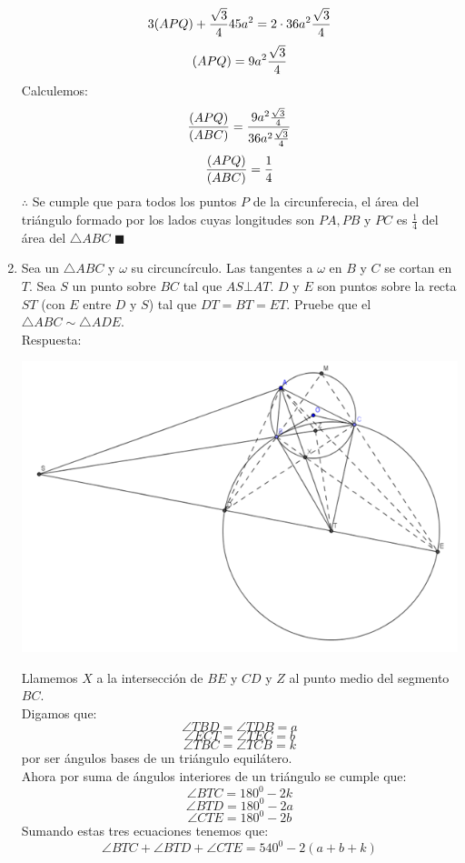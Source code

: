 \documentclass{book}
\begin{document}
\begin{enumerate}
        $$3(APQ)+{\sqrt{3}\over 4}45a^2=2\cdot 36a^2  {\sqrt{3}\over 4}$$
        $$(APQ)=9a^2 {\sqrt{3}\over 4}$$
        Calculemos:
        $$\frac{(APQ)}{(ABC)}=\frac{9a^2  {\sqrt{3}\over 4}}{36a^2  {\sqrt{3}\over 4}}$$
        $$\frac{(APQ)}{(ABC)}={1\over 4}$$
        $\therefore$ Se cumple que para todos los puntos $P$ de la circunferecia, el área del triángulo formado por los lados cuyas longitudes son $PA, PB$ y $PC$ es $\displaystyle{\frac{1}{4}}$ del área del $\triangle ABC$ $\blacksquare$\\
        \item Sea un $\triangle ABC$ y $\omega$ su circuncírculo. Las tangentes a $\omega$ en $B$ y $C$ se cortan en $T$. Sea $S$ un punto sobre $BC$ tal que $AS \bot AT$. $D$ y $E$ son puntos sobre la recta $ST$ (con $E$ entre $D$ y $S$) tal que $DT = BT =ET$. Pruebe que el $\triangle ABC\sim\triangle ADE$. \\
        Respuesta:
        \begin{center}
            \includegraphics[scale=1]{imagenes/Geometria/25,1.png}
        \end{center}
        Llamemos $X$ a la intersección de $BE$ y $CD$ y $Z$ al punto medio del segmento $BC$.\\
        Digamos que:
        $$\angle TBD=\angle TDB=a$$
        $$\angle ECT=\angle TEC=b$$
        $$\angle TBC=\angle TCB=k$$
        por ser ángulos bases de un triángulo equilátero.\\
        Ahora por suma de ángulos interiores de un triángulo se cumple que:
        $$\angle BTC=180^0-2k$$
        $$\angle BTD=180^0-2a$$
        $$\angle CTE=180^0-2b$$
        Sumando estas tres ecuaciones tenemos que:
        $$\angle BTC+\angle BTD+\angle CTE=540^0-2(a+b+k)$$

\end{enumerate}
\end{document}

